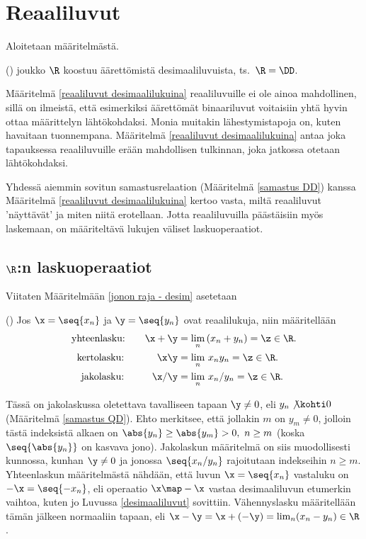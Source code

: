 \section{Reaaliluvut} \label{reaaliluvut}
\alku

Aloitetaan määritelmästä.
\begin{Def} \label{reaaliluvut desimaalilukuina} 
()  joukko $\R$ koostuu äärettömistä desimaaliluvuista,
ts.\ $\R=\DD$.
\end{Def}
Määritelmä \ref{reaaliluvut desimaalilukuina} reaaliluvuille ei ole ainoa mahdollinen, sillä on
ilmeistä, että esimerkiksi äärettömät binaariluvut voitaisiin yhtä hyvin ottaa määrittelyn
lähtökohdaksi. Monia muitakin lähestymistapoja on, kuten havaitaan tuonnempana. Määritelmä 
\ref{reaaliluvut desimaalilukuina} antaa joka tapauksessa reaaliluvuille erään mahdollisen 
tulkinnan, joka jatkossa otetaan lähtökohdaksi. 

Yhdessä aiemmin sovitun samastusrelaation (Määritelmä \ref{samastus DD}) kanssa Määritelmä 
\ref{reaaliluvut desimaalilukuina} kertoo vasta, miltä reaaliluvut 'näyttävät' ja miten niitä 
erotellaan. Jotta reaaliluvuilla päästäisiin myös laskemaan, on määriteltävä lukujen väliset
laskuoperaatiot. 

\subsection{$\R$:n laskuoperaatiot}

Viitaten Määritelmään \ref{jonon raja - desim} asetetaan
\begin{Def} \label{reaalilukujen laskutoimitukset}
() Jos $\x = \seq{x_n}$ ja $\y = \seq{y_n}$ ovat
reaalilukuja, niin määritellään
\begin{align*}
\text{yhteenlasku:} \quad\quad       \x+\y &= \lim_n\,(x_n+y_n) = \z\in\R. \\
\text{kertolasku:} \ \quad\quad\quad  \x\y &= \lim_n\,x_n y_n = \z\in\R.\\
\text{jakolasku:} \,\ \ \quad\quad   \x/\y &= \lim_n\,x_n / y_n = \z\in\R.
\end{align*} \end{Def}
Tässä on jakolaskussa oletettava tavalliseen tapaan $\y \neq 0$, eli $y_n \not\kohti 0$
(Määritelmä \ref{samastus QD}). Ehto merkitsee, että jollakin $m$ on  $y_m \neq 0$, jolloin
tästä indeksistä alkaen on $\abs{y_n} \ge \abs{y_m} > 0,\ n \ge m$ (koska $\seq{\abs{y_n}}$ on
kasvava jono). Jakolaskun määritelmä on siis muodollisesti kunnossa, kunhan $\y \neq 0$ ja
jonossa $\seq{x_n/y_n}$ rajoitutaan indekseihin $n \ge m$. Yhteenlaskun määritelmästä nähdään,
että luvun $\x = \seq{x_n}$ vastaluku on $-\x = \seq{-x_n}$, eli operaatio $\x \map -\x$ vastaa
desimaaliluvun etumerkin vaihtoa, kuten jo Luvussa \ref{desimaaliluvut} sovittiin. Vähennyslasku
määritellään tämän jälkeen normaaliin tapaan, eli $\x-\y=\x+(-\y)=\lim_n(x_n-y_n)\in\R$.

